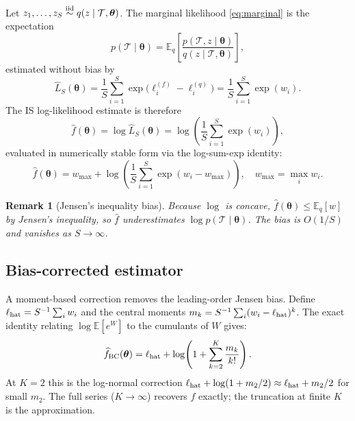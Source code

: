 \documentclass[12pt,a4paper]{article}
\newtheorem{remark}{Remark}
\newcommand{\obs}{\mathcal{T}}
\newcommand{\pars}{\bm{\theta}}
\newcommand{\fhat}{\widehat{f}}
\newcommand{\Lhat}{\widehat{L}}
\newcommand{\E}{\mathbb{E}}
\newcommand{\logf}{\ell^{(f)}}
\newcommand{\logq}{\ell^{(q)}}
\newcommand{\lw}{w}
\begin{document}
Let $z_1, \ldots, z_S \stackrel{\rm iid}{\sim} q(z \mid \obs, \pars)$.
The marginal likelihood \eqref{eq:marginal} is the expectation
\begin{equation}
  p(\obs \mid \pars)
  = \E_{q}\!\left[\frac{p(\obs, z \mid \pars)}{q(z \mid \obs, \pars)}\right],
\end{equation}
estimated without bias by
\begin{equation}\label{eq:IS}
  \Lhat_S(\pars) = \frac{1}{S}\sum_{i=1}^{S}
    \exp\!\bigl(\logf_i - \logq_i\bigr)
    = \frac{1}{S}\sum_{i=1}^{S} \exp(\lw_i).
\end{equation}
The IS log-likelihood estimate is therefore
\begin{equation}\label{eq:fhat}
  \fhat(\pars) = \log \Lhat_S(\pars)
  = \log\!\left(\frac{1}{S}\sum_{i=1}^{S} \exp(\lw_i)\right),
\end{equation}
evaluated in numerically stable form via the log-sum-exp identity:
\begin{equation}\label{eq:logsumexp}
  \fhat(\pars) = w_{\max} + \log\!\left(\frac{1}{S}\sum_{i=1}^{S}
    \exp(\lw_i - w_{\max})\right), \quad
  w_{\max} = \max_i \lw_i.
\end{equation}

\begin{remark}[Jensen's inequality bias]\label{rem:jensen}
Because $\log$ is concave, $\fhat(\pars) \leq \E_q[\lw]$ by Jensen's
inequality, so $\fhat$ underestimates $\log p(\obs\mid\pars)$. The bias
is $O(1/S)$ and vanishes as $S\to\infty$.
\end{remark}

\subsection{Bias-corrected estimator}\label{sec:biascorrect}

A moment-based correction removes the leading-order Jensen bias. Define
$\ell_{\rm hat} = S^{-1}\sum_i \lw_i$ and the central moments
$m_k = S^{-1}\sum_i (\lw_i - \ell_{\rm hat})^k$. The exact identity
relating $\log\E[e^W]$ to the cumulants of $W$ gives:
\begin{equation}\label{eq:biascorrect}
  \fhat_{\rm BC}(\pars) = \ell_{\rm hat}
    + \log\!\left(1 + \sum_{k=2}^{K}\frac{m_k}{k!}\right).
\end{equation}
At $K=2$ this is the log-normal correction $\ell_{\rm hat} + \log(1 + m_2/2)
\approx \ell_{\rm hat} + m_2/2$ for small $m_2$. The full series
($K\to\infty$) recovers $\fhat$ exactly; the truncation at finite $K$ is the
approximation.
\end{document}
